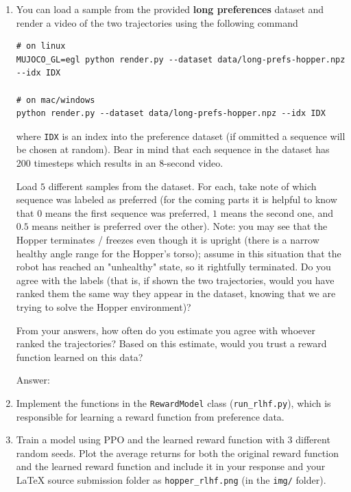 \documentclass{article}
\newcommand{\answer}[1]{
    \begin{tcolorbox}[breakable]
    Answer: #1
    \end{tcolorbox}
    \clearpage
}
\begin{document}
\begin{enumerate}
\item[(c)] You can load a sample from the provided \textbf{long preferences} dataset and render a video of the two trajectories using the following command

{\small
\begin{tcolorbox}
\begin{verbatim}
# on linux
MUJOCO_GL=egl python render.py --dataset data/long-prefs-hopper.npz --idx IDX

# on mac/windows
python render.py --dataset data/long-prefs-hopper.npz --idx IDX
\end{verbatim}
\end{tcolorbox}
}

where \texttt{IDX} is an index into the preference dataset (if ommitted a sequence will be chosen at random). Bear in mind that each sequence in the dataset has 200 timesteps which results in an $8$-second video.

Load $5$ different samples from the dataset. For each, take note of which sequence was labeled as preferred (for the coming parts it is helpful to know that $0$ means the first sequence was preferred, $1$ means the second one, and $0.5$ means neither is preferred over the other). Note: you may see that the Hopper terminates / freezes even though it is upright (there is a narrow healthy angle range for the Hopper's torso); assume in this situation that the robot has reached an "unhealthy" state, so it rightfully terminated. Do you agree with the labels (that is, if shown the two trajectories, would you have ranked them the same way they appear in the dataset, knowing that we are trying to solve the Hopper environment)?

From your answers, how often do you estimate you agree with whoever ranked the trajectories? Based on this estimate, would you trust a reward function learned on this data?
\answer{

}

\item[(d)] Implement the functions in the \texttt{RewardModel} class  (\texttt{run\_rlhf.py}), which is responsible for learning a reward function from preference data.

\item[(e)] Train a model using PPO and the learned reward function with 3 different random seeds. Plot the average returns for both the original reward function and the learned reward function and include it in your response and your LaTeX source submission folder as \texttt{hopper\_rlhf.png} (in the \texttt{img/} folder).


\end{enumerate}
\end{document}

